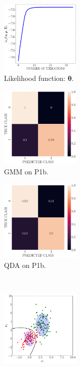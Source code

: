 \documentclass[11pt, a4 paper]{article}
\newcommand{\btheta}{\boldsymbol{\theta}}
\begin{document}
\begin{figure}[!htbp]
\centering
\quad
    \begin{subfigure}[!htbp]{0.24\textwidth}
       \centering
       \includegraphics[width=1.5in]{../results/ex1/loss_GMM_EM_dataset_P1b_size_199.pdf}
       \caption{Likelihood function: $\btheta$.}
       \label{fig:gmmLoss}
    \end{subfigure}
\quad    
    \begin{subfigure}[!htbp]{0.24\textwidth}
       \centering
       \includegraphics[width=1.5in]{../results/ex1/conf_mtx_GMM_EM_dataset_P1b_size_199.pdf}
       \caption{GMM on P1b.}
       \label{fig:GMM_P1b}
    \end{subfigure}
\quad    
    \begin{subfigure}[!htbp]{0.24\textwidth}
       \centering
       \includegraphics[width=1.5in]{../results/ex1/conf_mtx_QD_ML_dataset_P1b_size_199.pdf}
       \caption{QDA on P1b.}
       \label{fig:GMM_QDA_P1b}
    \end{subfigure}
\\
    \begin{subfigure}[!htbp]{0.24\textwidth}
       \centering
       \includegraphics[width=1.5in]{../results/ex1/samples_GMM_EM_dataset_P1b_size_199.pdf}

\end{subfigure}
\end{figure}
\end{document}
